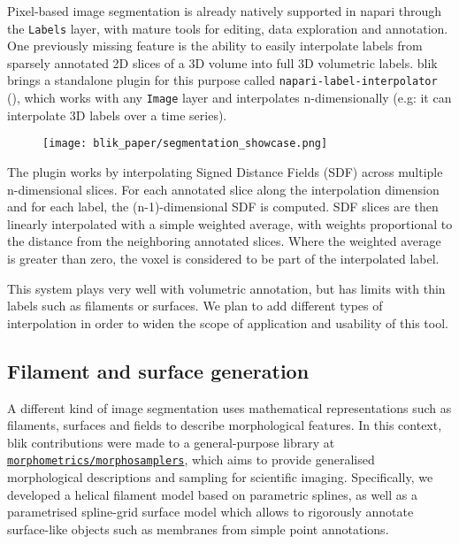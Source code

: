 Pixel-based image segmentation is already natively supported in napari through the \texttt{Labels} layer, with mature tools for editing, data exploration and annotation. One previously missing feature is the ability to easily interpolate labels from sparsely annotated 2D slices of a 3D volume into full 3D volumetric labels. blik brings a standalone plugin for this purpose called \texttt{napari-label-interpolator} (), which works with any \texttt{Image} layer and interpolates n-dimensionally (e.g: it can interpolate 3D labels over a time series).

\begin{figure}[!ht]
    \centering
    \texttt{[image: blik\_paper/segmentation\_showcase.png]}
    \label{interpolator-showcase}
\end{figure}

The plugin works by interpolating Signed Distance Fields (SDF) across multiple n-dimensional slices. For each annotated slice along the interpolation dimension and for each label, the (n-1)-dimensional SDF is computed. SDF slices are then linearly interpolated with a simple weighted average, with weights proportional to the distance from the neighboring annotated slices. Where the weighted average is greater than zero, the voxel is considered to be part of the interpolated label.

This system plays very well with volumetric annotation, but has limits with thin labels such as filaments or surfaces. We plan to add different types of interpolation in order to widen the scope of application and usability of this tool.

\subsection{Filament and surface generation}\label{filament-and-surface-generation}

A different kind of image segmentation uses mathematical representations such as filaments, surfaces and fields to describe morphological features. In this context, blik contributions were made to a general-purpose library at \href{https://github.com/morphometrics/morphosamplers}{\texttt{morphometrics\-/\-morphosamplers}}, which aims to provide generalised morphological descriptions and sampling for scientific imaging. Specifically, we developed a helical filament model based on parametric splines, as well as a parametrised spline-grid surface model which allows to rigorously annotate surface-like objects such as membranes from simple point annotations.

